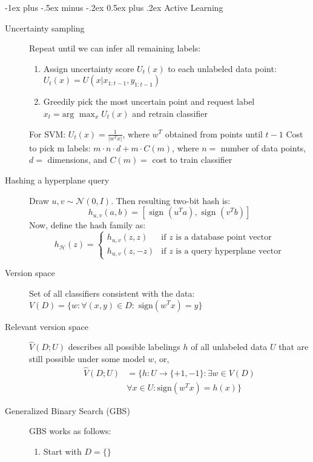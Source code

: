 \documentclass[11pt,landscape]{article}
\makeatletter
\renewcommand{\section}{\@startsection{section}{1}{0mm}%
                                {-1ex plus -.5ex minus -.2ex}%
                                {0.5ex plus .2ex}%
                                {\normalfont\normalsize\bfseries}}
\makeatother
\begin{document}
\begin{multicols}{3}
\section{Active Learning}
\begin{description}
    \item[Uncertainty sampling] Repeat until we can infer all remaining labels:
    \begin{enumerate}
        \item Assign uncertainty score $U_t(x)$ to each unlabeled data point:
        $U_t(x) = U \left ( x | x_{1:t-1},y_{1:t-1} \right )$
        \item Greedily pick the most uncertain point and request label
        $x_t = \text{arg } \max_x U_t(x)$ and retrain classifier
    \end{enumerate}
    \subitem For SVM: $U_t(x) = \frac{1}{|w^T x|}$, where $w^T$ obtained from points until $t-1$
    \subitem Cost to pick m labels: $m \cdot n \cdot d + m \cdot C(m)$, where $n =$ number of data points, $d =$ dimensions, and $C(m) =$ cost to train classifier
    \item[Hashing a hyperplane query] Draw $u,v \sim \mathcal{N}(0,I)$. Then resulting two-bit hash is: 
    $$ h_{u,v}(a,b) = \left [ \text{ sign }(u^T a),\text{ sign }(v^T b) \right ]$$
    Now, define the hash family as: 
    $$
    h_{\mathcal{H}}(z) = \begin{cases}
        h_{u,v} (z,z) & \text{if $z$ is a database point vector} \\
        h_{u,v} (z,-z) & \text{if $z$ is a query hyperplane vector}
    \end{cases}$$
    \item[Version space] Set of all classifiers consistent with the data: 
        $V(D) = \{w : \forall (x,y) \in D : \text{ sign}(w^T x) = y \}$
    \item[Relevant version space] $\hat{V}(D;U)$ describes all possible labelings $h$ of all unlabeled data $U$ that are still possible under some model $w$, or,
    \begin{align*}
        \hat{V}(D;U) &= \{h: U \rightarrow  \{+1,-1\}  : \exists w  \in V(D)\\ 
        &\forall x \in U : \text{sign}(w^T x) = h(x) \}
    \end{align*}
    \item[Generalized Binary Search (GBS)] GBS works as follows:
    \begin{enumerate}
        \item Start with $D = \{\}$

\end{enumerate}
\end{description}
\end{multicols}
\end{document}
